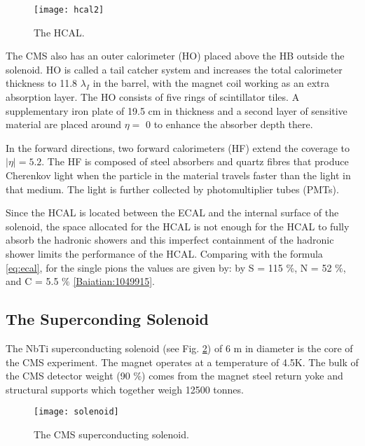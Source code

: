 \begin{normalsize}
\begin{figure}[H]
  \centering
  \texttt{[image: hcal2]}
  \caption[The HCAL]{The HCAL.}
  \label{hcal2}
\end{figure}


The CMS also has an outer calorimeter (HO) placed above the HB outside the solenoid. HO is called a tail catcher system and increases the total calorimeter thickness to 11.8 $\lambda_I$ in the barrel, with the magnet coil working as an extra absorption layer. The HO consists of five rings of scintillator tiles. A supplementary iron plate of 19.5 cm in thickness and a second layer of sensitive material are placed around $\eta =$ 0 to enhance the absorber depth there. 

In the forward directions, two forward calorimeters (HF) extend the coverage to  $|\eta| = 5.2$. The HF is composed of steel absorbers and quartz fibres that produce Cherenkov light when the particle in the material travels faster than the light in that medium. The light is further collected by photomultiplier tubes (PMTs). 


Since the HCAL is located between the ECAL and the internal surface of the solenoid, the space allocated for the HCAL is not enough for the HCAL to fully absorb the hadronic showers and this imperfect containment of the hadronic shower limits the performance of the HCAL. Comparing with the formula \ref{eq:ecal}, for the single pions the values are given by:  by S = 115 $\%$, N = 52  $\%$, and C = 5.5 $\%$ \ref{Baiatian:1049915}.





\subsection{The Superconding Solenoid}


The NbTi superconducting solenoid (see Fig. \ref{solenoid}) of 6 m in diameter is the core of the CMS experiment. The magnet operates at a temperature of 4.5K. The bulk of the CMS detector weight (90 $\%$) comes from the magnet steel return yoke and structural supports which together weigh 12500 tonnes.
 
 \begin{figure}[H]
  \centering
  \texttt{[image: solenoid]}
  \caption[The CMS superconducting solenoid]{The CMS superconducting solenoid.}
  \label{solenoid}
\end{figure}


\end{normalsize}
